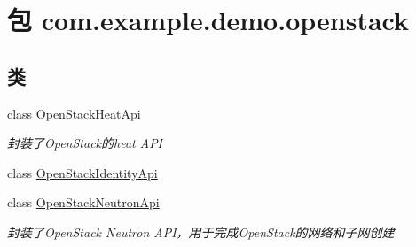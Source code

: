 \hypertarget{namespacecom_1_1example_1_1demo_1_1openstack}{}\section{包 com.\+example.\+demo.\+openstack}
\label{namespacecom_1_1example_1_1demo_1_1openstack}
\subsection*{类}
\begin{DoxyCompactItemize}
\item 
class \mbox{\hyperlink{classcom_1_1example_1_1demo_1_1openstack_1_1_open_stack_heat_api}{Open\+Stack\+Heat\+Api}}
\begin{DoxyCompactList}\small\item\em 封装了\+Open\+Stack的heat A\+PI \end{DoxyCompactList}\item 
class \mbox{\hyperlink{classcom_1_1example_1_1demo_1_1openstack_1_1_open_stack_identity_api}{Open\+Stack\+Identity\+Api}}
\item 
class \mbox{\hyperlink{classcom_1_1example_1_1demo_1_1openstack_1_1_open_stack_neutron_api}{Open\+Stack\+Neutron\+Api}}
\begin{DoxyCompactList}\small\item\em 封装了\+Open\+Stack Neutron A\+P\+I，用于完成\+Open\+Stack的网络和子网创建 \end{DoxyCompactList}\end{DoxyCompactItemize}
